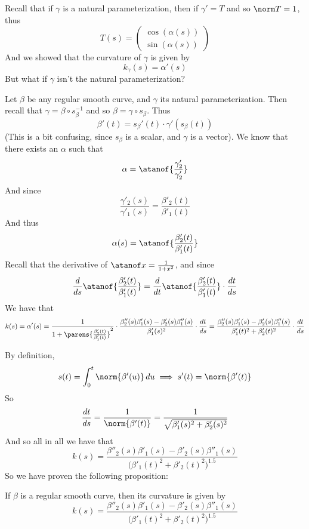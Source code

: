 \documentclass[10pt]{article}
\def\pmat#1{\begin{pmatrix} #1 \end{pmatrix}}
\def\pmat#1{\begin{pmatrix}#1\end{pmatrix}}
\begin{document}


\bigskip

Recall that if $\gamma$ is a natural parameterization, then if $\gamma'=T$ and so $\norm T=1$, thus
\[ T(s) = \pmat{\cos(\alpha(s)) \\ \sin(\alpha(s))} \]
And we showed that the curvature of $\gamma$ is given by
\[ k_\gamma(s) = \alpha'(s) \]
But what if $\gamma$ isn't the natural parameterization?

Let $\beta$ be any regular smooth curve, and $\gamma$ its natural parameterization.
Then recall that $\gamma=\beta\circ s_\beta^{-1}$ and so $\beta=\gamma\circ s_\beta$.
Thus
\[ \beta'(t) = s_\beta'(t)\cdot\gamma'(s_\beta(t)) \]
(This is a bit confusing, since $s_\beta$ is a scalar, and $\gamma$ is a vector).
We know that there exists an $\alpha$ such that
\[ \alpha = \atanof{\frac{\gamma'_2}{\gamma'_2}} \]
And since
\[ \frac{\gamma'_2(s)}{\gamma'_1(s)} = \frac{\beta'_2(t)}{\beta'_1(t)} \]
And thus
\[ \alpha(s) = \atanof{\frac{\beta'_2(t)}{\beta'_1(t)}} \]
Recall that the derivative of $\atanof x=\frac1{1+x^2}$, and since
\[ \frac d{ds}\atanof{\frac{\beta'_2(t)}{\beta'_1(t)}} = \frac d{dt}\atanof{\frac{\beta'_2(t)}{\beta'_1(t)}}\cdot\frac{dt}{ds} \]
We have that
\[ k(s) = \alpha'(s) = \frac1{1+\parens{\frac{\beta'_2(t)}{\beta'_1(t)}}^2}\cdot\frac{\beta''_2(s)\beta'_1(s)-\beta'_2(s)\beta''_1(s)}{\beta'_1(s)^2}\cdot\frac{dt}{ds} =
\frac{\beta''_2(s)\beta'_1(s)-\beta'_2(s)\beta''_1(s)}{\beta'_1(t)^2+\beta'_2(t)^2}\cdot\frac{dt}{ds} \]

By definition,
\[ s(t) = \int_0^t \norm{\beta'(u)}\,du \implies s'(t) = \norm{\beta'(t)} \]
So
\[ \frac{dt}{ds} = \frac1{\norm{\beta'(t)}} = \frac1{\sqrt{\beta'_1(s)^2+\beta_2'(s)^2}} \]
And so all in all we have that
\[ k(s) = \frac{\beta''_2(s)\beta'_1(s)-\beta'_2(s)\beta''_1(s)}{\bigl(\beta'_1(t)^2+\beta'_2(t)^2\bigr)^{1.5}} \]
So we have proven the following proposition:

\begin{prop*}

    If $\beta$ is a regular smooth curve, then its curvature is given by
    \[ k(s) = \frac{\beta''_2(s)\beta'_1(s)-\beta'_2(s)\beta''_1(s)}{\bigl(\beta'_1(t)^2+\beta'_2(t)^2\bigr)^{1.5}} \]

\end{prop*}
\end{document}
